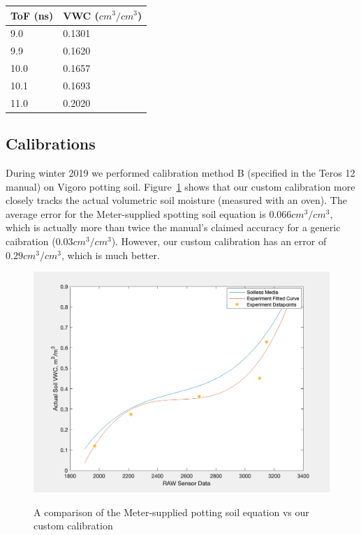 \documentclass[12pt]{article}
\begin{document}
\begin{table}[]
  \centering
\begin{tabular}{l|l}
\textbf{ToF (ns)} & \textbf{VWC ($cm^3/cm^3$)} \\ \hline
9.0               & 0.1301                                                      \\
9.9              & 0.1620                                                       \\
  10.0              & 0.1657                                                       \\
10.1              & 0.1693                                                       \\
11.0              & 0.2020                                                      
\end{tabular}
\end{table}

\subsection*{Calibrations}
During winter 2019 we performed calibration method B (specified in the
Teros 12 manual) on Vigoro potting soil. Figure~\ref{figure:calib}
shows that our custom calibration more closely tracks the actual
volumetric soil moisture (measured with an oven). The average error
for the Meter-supplied spotting soil equation is $0.066 cm^3/cm^3$,
which is actually more than twice the manual's claimed accuracy for a
generic caibration ($0.03 cm^3/cm^3$). However, our custom calibration
has an error of $0.29cm^3/cm^3$, which is much better.

\begin{figure}[h!]
  \centering
  \includegraphics[scale=0.8]{teros12calib.png}\\
  \caption{A comparison of the Meter-supplied potting soil equation vs our custom calibration}
  \label{figure:calib}
\end{figure}
\end{document}
